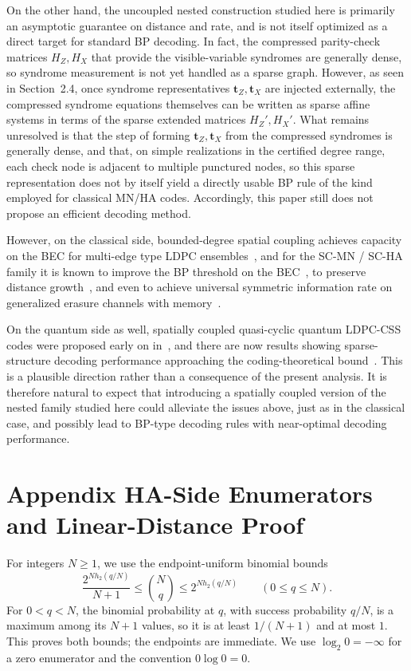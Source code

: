 \documentclass[11pt]{article}
\theoremstyle{definition}
\newcommand{\engappendixsection}[2]{%
  \refstepcounter{section}%
  \section*{Appendix \thesection\quad #1}%
  \label{#2}%
}
\newcommand{\bt}{\mathbf t}
\newcommand{\h}{h_2}
\begin{document}
On the other hand, the uncoupled nested construction studied here is primarily an asymptotic guarantee on distance and rate,
and is not itself optimized as a direct target for standard BP decoding.
In fact, the compressed parity-check matrices \(H_Z,H_X\) that provide the visible-variable syndromes are generally dense,
so syndrome measurement is not yet handled as a sparse graph.
However, as seen in Section~2.4, once syndrome representatives \(\bt_Z,\bt_X\) are injected externally, the compressed syndrome equations themselves can be written as sparse affine systems in terms of the sparse extended matrices \(H_Z',H_X'\). What remains unresolved is that the step of forming \(\bt_Z,\bt_X\) from the compressed syndromes is generally dense, and that, on simple realizations in the certified degree range, each check node is adjacent to multiple punctured nodes, so this sparse representation does not by itself yield a directly usable BP rule of the kind employed for classical MN/HA codes. Accordingly, this paper still does not propose an efficient decoding method.

However, on the classical side, bounded-degree spatial coupling achieves capacity on the BEC for multi-edge type LDPC ensembles~\cite{ObataJKP13},
and for the SC-MN / SC-HA family it is known to improve the BP threshold on the BEC~\cite{KasaiSak11},
to preserve distance growth~\cite{Mitchell12},
and even to achieve universal symmetric information rate on generalized erasure channels with memory~\cite{FukushimaOK15}.

On the quantum side as well, spatially coupled quasi-cyclic quantum LDPC-CSS codes were proposed early on in~\cite{HagiwaraKIS11},
and there are now results showing sparse-structure decoding performance approaching
the coding-theoretical bound~\cite{KomotoKasai25}.
This is a plausible direction rather than a consequence of the present analysis.
It is therefore natural to expect that introducing a spatially coupled version of the nested family studied here
could alleviate the issues above, just as in the classical case, and possibly lead to BP-type decoding rules with near-optimal decoding performance.

\appendix
\renewcommand{\thesection}{}

\engappendixsection{HA-Side Enumerators and Linear-Distance Proof}{app:HA-proofs-jp}

For integers \(N\ge1\), we use the endpoint-uniform binomial bounds
\begin{equation}\label{eq:binomial-uniform-jp}
\frac{2^{N\h(q/N)}}{N+1}\le\binom Nq\le2^{N\h(q/N)}
\qquad(0\le q\le N).
\end{equation}
For \(0<q<N\), the binomial probability at \(q\), with success
probability \(q/N\), is a maximum among its \(N+1\) values, so it is
at least \(1/(N+1)\) and at most \(1\). This proves both bounds;
the endpoints are immediate. We use \(\log_2 0=-\infty\) for a zero
enumerator and the convention \(0\log 0=0\).
\end{document}
